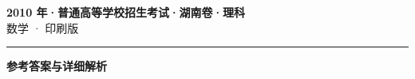 \documentclass[zihao=5, a4paper]{ctexart}
\begin{document}
\begin{center}
  {\Large\bfseries 2010 年·普通高等学校招生考试·湖南卷·理科}\\[4pt]
  {\large 数学 · 印刷版}
\end{center}
\medskip
{}

\par\bigskip\hrule\bigskip
{}
\begin{center}{\large\bfseries 参考答案与详细解析}\end{center}
\smallskip

\end{document}
